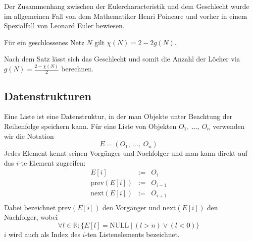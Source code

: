 Der Zusammenhang zwischen der Eulercharacteristik und dem Geschlecht wurde im allgemeinen Fall von dem Mathematiker  
Henri Poincare und vorher in einem Spezialfall von Leonard Euler bewiesen. 
\begin{Satz}
Für ein geschlossenes Netz $N$ gilt $\chi(N) = 2 - 2g(N)$. 
\end{Satz}

\begin{Bemerkung}
Nach dem Satz lässt sich das Geschlecht und somit die Anzahl der Löcher via $g(N) = \frac{2- \chi(N)}{2}$ berechnen.
\end{Bemerkung}

\subsection{Datenstrukturen}
\begin{Definition}
Eine Liste ist eine Datenstruktur, in der man Objekte unter Beachtung der 
Reihenfolge speichern kann. 
Für eine Liste von Objekten $O_1,~\hdots,~O_n$ verwenden wir die Notation 
\begin{equation*}
    E = (O_1,~\hdots,~O_n )
\end{equation*}
Jedes Element kennt seinen Vorgänger und Nachfolger und man kann direkt 
auf das $i$-te Element zugreifen:
\begin{equation*}
    \begin{matrix}
        E[i] & := & O_i \\
        \textrm{prev}(E[i]) & := & O_{i-1} \\
        \textrm{next}(E[i]) & := & O_{i+1} \\
    \end{matrix}
\end{equation*}
Dabei bezeichnet $\textrm{prev}(E[i])$ den Vorgänger und $\textrm{next}(E[i])$ 
den Nachfolger, wobei 
\begin{equation*}
    \forall l \in \mathbb{R} : \{E[l] = \textrm{NULL}~|~(l>n) \vee (l<0)\}
\end{equation*}
$i$ wird auch als Index des $i$-ten Listenelements bezeichnet. 
\end{Definition}

